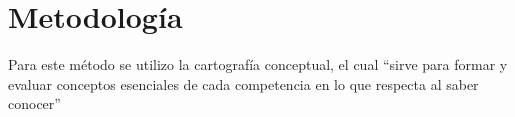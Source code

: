 \section{Metodología}
Para este método se utilizo la cartografía conceptual, el cual “sirve para formar y evaluar conceptos esenciales de cada competencia en lo que respecta al saber conocer” \parencite[][p. 16]{tobon2012} 


%


